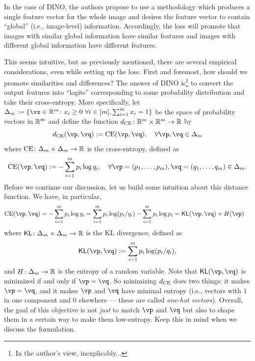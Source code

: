 \documentclass[../../book-main.tex]{subfiles}
\begin{document}
In the case of DINO, the authors propose to use a methodology which produces a single feature vector for the whole image and desires the feature vector to contain ``global'' (i.e., image-level) information. Accordingly, the loss will promote that images with similar global information have similar features and images with different global information have different features.

This seems intuitive, but as previously mentioned, there are several empirical considerations, even while setting up the loss. First and foremost, how should we promote similarities and differences? The answer of DINO \citep{caron2021emerging} is\footnote{In the author's view, inexplicably...} to convert the output features into ``logits'' corresponding to some probability distribution and take their cross-entropy. More specifically, let \(\Delta_{m} := \{\vx \in \R^{m} \colon x_{i} \geq 0\ \forall i \in [m], \sum_{i = 1}^{m}x_{i} = 1\}\) be the space of probability vectors in \(\mathbb{R}^{m}\) and define the function \(d_{\operatorname{CE}} \colon \mathbb{R}^{m} \times \mathbb{R}^{m} \to \mathbb{R}\) by
 \begin{equation}\label{eq:cross_entropy_difference}
    d_{\CE}(\vp, \vq) := \CE(\vp, \vq), \quad \forall \vp, \vq \in \Delta_{m}
 \end{equation}
 where \(\operatorname{CE} \colon \Delta_{m} \times \Delta_{m} \to \mathbb{R}\) is the cross-entropy, defined as 
 \begin{equation}\label{eq:expts_def_ce}
    \CE(\vp, \vq) := -\sum_{i = 1}^{m}p_{i}\log q_{i}, \quad \forall \vp = (p_{1}, \dots, p_{m}), \vq = (q_{1}, \dots, q_{m}) \in \Delta_{m}.
 \end{equation}
 Before we continue our discussion, let us build some intuition about this distance function. We have, in particular,
 \begin{align}
    \CE(\vp, \vq)
    &= -\sum_{i = 1}^{m}p_{i}\log q_{i} = \sum_{i = 1}^{m}p_{i}\log(p_{i}/q_{i}) - \sum_{i = 1}^{m}p_{i}\log p_{i} = \KL(\vp, \vq) + H(\vp)
 \end{align}
 where \(\operatorname{\mathsf{KL}} \colon \Delta_{m} \times \Delta_{m} \to \mathbb{R}\) is the KL divergence, defined as 
 \begin{equation}
    \KL(\vp, \vq) := \sum_{i = 1}^{m}p_{i}\log(p_{i}/q_{i}),
 \end{equation}
 and \(H \colon \Delta_{m} \to \mathbb{R}\) is the entropy of a random variable. Note that \(\KL(\vp, \vq)\) is minimized if and only if \(\vp = \vq\). So minimizing \(d_{\operatorname{CE}}\) does two things: it makes \(\vp = \vq\), and it makes \(\vp\) and \(\vq\) have minimal entropy (i.e., vectors with \(1\) in one component and \(0\) elsewhere --- these are called \textit{one-hot vectors}). Overall, the goal of this objective is not \textit{just} to match \(\vp\) and \(\vq\) but also to shape them in a certain way to make them low-entropy. Keep this in mind when we discuss the formulation.
\end{document}
